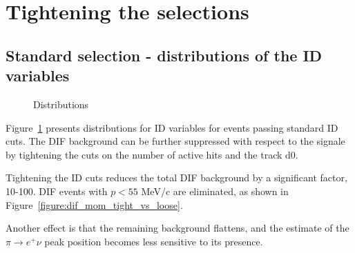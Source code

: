 \section {Tightening the selections}


\subsection{Standard selection - distributions of the ID variables }

\begin{figure}[H]
  \caption{
    \label{figure:id_vars_for_events_passed_loose_cits}
    Distributions 
  }
\end{figure}

Figure~\ref{figure:id_vars_for_events_passed_loose_cits} presents distributions for ID variables
for events passing standard ID cuts. The DIF background can be further suppressed with respect to
the signale by tightening the cuts on the number of active hits and the track d0.

Tightening the ID cuts reduces the total DIF background by a significant factor, 10-100.
DIF events with $p < 55$ MeV/c are eliminated, as shown in Figure~\ref{figure:dif_mom_tight_vs_loose}.

Another effect is that the remaining background flattens, and the estimate of the $\pi \to e^+ \nu$
peak position becomes less sensitive to its presence.

